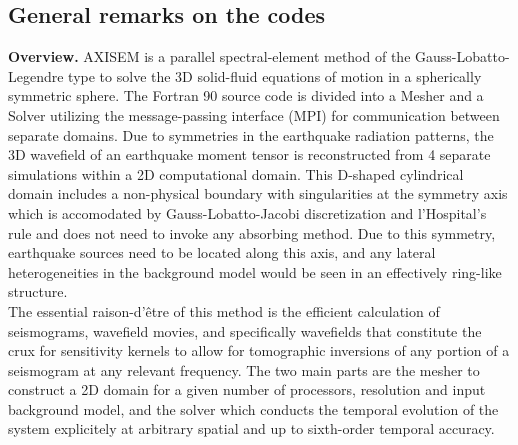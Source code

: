 \documentclass[11pt,letter,fleqn,english,notitlepage]{article}
\begin{document}
\subsection{General remarks on the codes}
\textbf{Overview.} 
AXISEM is a parallel spectral-element method of the Gauss-Lobatto-Legendre type to 
solve the 3D solid-fluid equations of motion in a spherically symmetric sphere. The Fortran 90 source 
code is divided into a Mesher and a Solver utilizing the message-passing interface (MPI) for communication
between separate domains. Due to symmetries in the earthquake radiation patterns, 
the 3D wavefield of an earthquake moment tensor is reconstructed from 4 separate simulations
within a 2D computational domain. This D-shaped cylindrical domain includes a non-physical boundary with
singularities at the symmetry axis which is accomodated by Gauss-Lobatto-Jacobi discretization and 
l'Hospital's rule and does not need to invoke any absorbing method. Due to this symmetry, earthquake 
sources need to be located along this axis, and any lateral heterogeneities in the background model 
would be seen in an effectively ring-like structure.\\
The essential raison-d'\^{e}tre of this method is the efficient calculation 
of seismograms, wavefield movies, and specifically wavefields that constitute the crux for 
sensitivity kernels to allow for tomographic inversions of any portion of a seismogram at any relevant 
frequency. The two main parts are the mesher to construct a 2D domain for a given number of processors, 
resolution and input background model, and the solver which conducts the temporal evolution of the system 
explicitely at arbitrary spatial and up to sixth-order temporal accuracy.\\
\end{document}
